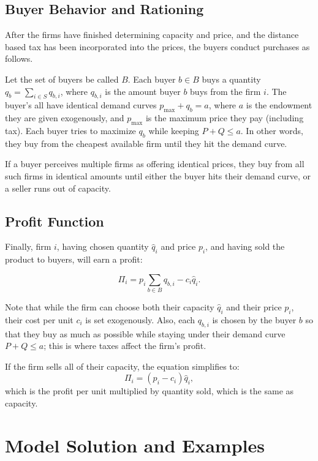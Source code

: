 \documentclass[11pt]{article}
\begin{document}
\subsection{Buyer Behavior and Rationing}
After the firms have finished determining capacity and price, and the distance
based tax has been incorporated into the prices, the buyers conduct purchases
as follows.

Let the set of buyers be called $B$. Each buyer $b\in B$ buys a quantity $q_b =
\sum_{i\in S} q_{b,i}$, where $q_{b,i}$ is the amount buyer $b$ buys from the
firm $i$. The buyer's all have identical demand curves $p_\text{max} + q_b =
a$, where $a$ is the endowment they are given exogenously, and $p_\text{max}$
is the maximum price they pay (including tax). Each buyer tries to maximize
$q_b$ while keeping $P + Q \le a$. In other words, they buy from the cheapest
available firm until they hit the demand curve.

If a buyer perceives multiple firms as offering identical prices, they buy from
all such firms in identical amounts until either the buyer hits their demand
curve, or a seller runs out of capacity. 

\subsection{Profit Function}
Finally, firm $i$, having chosen quantity $\hat q_i$ and price $p_i$, and
having sold the product to buyers, will earn a profit:

\begin{equation}
    \Pi_i = p_i\sum_{b\in B} q_{b,i} - c_i\hat q_i.
\end{equation}

Note that while the firm can choose both their capacity $\hat q_i$ and their
price $p_i$, their cost per unit $c_i$ is set exogenously. Also, each $q_{b,i}$
is chosen by the buyer $b$ so that they buy as much as possible while staying
under their demand curve $P+Q\leq a$; this is where taxes affect the firm's
profit.

If the firm sells all of their capacity, the equation simplifies to:
\begin{equation}
    \Pi_i = (p_i- c_i)\hat q_i,
\end{equation}
which is the profit per unit multiplied by quantity sold, which is the same as
capacity.

\section{Model Solution and Examples}
\end{document}
